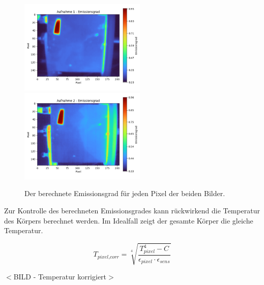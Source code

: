 \documentclass[10pt,a4paper,german]{article}
\begin{document}
\begin{figure}[H]
    \centering
    \captionsetup{width=12cm}
    \includegraphics[width=6cm]{img/eps_1.png}
    \includegraphics[width=6cm]{img/eps_2.png}
    \caption{Der berechnete Emissionsgrad für jeden Pixel der beiden Bilder.}
\end{figure}

Zur Kontrolle des berechneten Emissionsgrades kann rückwirkend die Temperatur des Körpers berechnet werden.
Im Idealfall zeigt der gesamte Körper die gleiche Temperatur.

\begin{equation}
    T_\textit{pixel,corr} = \sqrt[4]{\frac{T_\textit{pixel}^4 - C}{\epsilon_\textit{pixel} \cdot \epsilon_\textit{sens}}}
\end{equation}

\begin{center}
    $<$BILD - Temperatur korrigiert$>$
\end{center}
\end{document}
